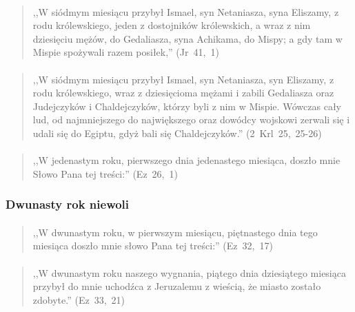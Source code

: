 \documentclass[10pt,a4paper,oneside]{article}
\begin{document}
\paragraph{}
\begin{quote}
,,W siódmym miesiącu przybył Ismael, syn Netaniasza, syna Eliszamy, z rodu królewskiego, jeden z dostojników królewskich, a wraz z nim dziesięciu mężów, do Gedaliasza, syna Achikama, do Mispy; a gdy tam w Mispie spożywali razem posiłek,'' \mbox{(Jr 41, 1)}
\end{quote}
\paragraph{}
\begin{quote}
,,W siódmym miesiącu przybył Ismael, syn Netaniasza, syn Eliszamy, z rodu królewskiego, wraz z dziesięcioma mężami i zabili Gedaliasza oraz Judejczyków i Chaldejczyków, którzy byli z nim w Mispie. Wówczas cały lud, od najmniejszego do największego oraz dowódcy wojskowi zerwali się i udali się do Egiptu, gdyż bali się Chaldejczyków.'' \mbox{(2 Krl 25, 25-26)}
\end{quote}
\paragraph{}
\begin{quote}
,,W jedenastym roku, pierwszego dnia jedenastego miesiąca, doszło mnie Słowo Pana tej treści:'' \mbox{(Ez 26, 1)}
\end{quote}
\subsubsection{Dwunasty rok niewoli}
\paragraph{}
\begin{quote}
,,W dwunastym roku, w pierwszym miesiącu, piętnastego dnia tego miesiąca doszło mnie słowo Pana tej treści:'' \mbox{(Ez 32, 17)}
\end{quote}
\paragraph{}
\begin{quote}
,,W dwunastym roku naszego wygnania, piątego dnia dziesiątego miesiąca przybył do mnie uchodźca z Jeruzalemu z wieścią, że miasto zostało zdobyte.'' \mbox{(Ez 33, 21)}
\end{quote}
\end{document}
